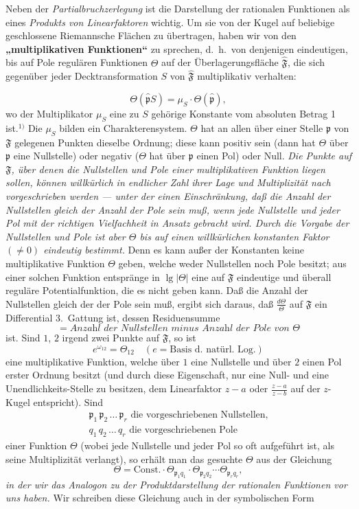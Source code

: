 \documentclass{article}
\begin{document}
Neben der \emph{Partialbruchzerlegung} ist die Darstellung der rationalen Funktionen als eines \emph{Produkts von Linearfaktoren} wichtig. Um sie von der Kugel auf beliebige geschlossene Riemannsche Flächen zu übertragen, haben wir von den \textbf{„multiplikativen Funktionen“} zu sprechen, d.\ h.\ von denjenigen eindeutigen, bis auf Pole regulären Funktionen $\Theta$ auf der Überlagerungsfläche $\hat{\mathfrak{F}}$, die sich gegenüber jeder Decktransformation $S$ von $\hat{\mathfrak{F}}$ multiplikativ verhalten:

\[ \Theta(\hat{\mathfrak{p}}S) = \mu_S \cdot \Theta(\hat{\mathfrak{p}}), \]
wo der Multiplikator $\mu_S$ eine zu $S$ gehörige Konstante vom absoluten Betrag 1 ist.${}^{1)}$ Die $\mu_S$ bilden ein Charakterensystem. $\Theta$ hat an allen über einer Stelle $\mathfrak{p}$ von $\mathfrak{F}$ gelegenen Punkten dieselbe Ordnung; diese kann positiv sein (dann hat $\Theta$ über $\mathfrak{p}$ eine Nullstelle) oder negativ ($\Theta$ hat über $\mathfrak{p}$ einen Pol) oder Null. \emph{Die Punkte auf $\mathfrak{F}$, über denen die Nullstellen und Pole einer multiplikativen Funktion liegen sollen, können willkürlich in endlicher Zahl ihrer Lage und Multiplizität nach vorgeschrieben werden --- unter der einen Einschränkung, daß die Anzahl der Nullstellen gleich der Anzahl der Pole sein muß, wenn jede Nullstelle und jeder Pol mit der richtigen Vielfachheit in Ansatz gebracht wird. Durch die Vorgabe der Nullstellen und Pole ist aber $\Theta$ bis auf einen willkürlichen konstanten Faktor $(\neq 0)$ eindeutig bestimmt.} Denn es kann außer der Konstanten keine multiplikative Funktion $\Theta$ geben, welche weder Nullstellen noch Pole besitzt; aus einer solchen Funktion entspränge in $\lg |\Theta|$ eine auf $\mathfrak{F}$ eindeutige und überall reguläre Potentialfunktion, die es nicht geben kann. Daß die Anzahl der Nullstellen gleich der der Pole sein muß, ergibt sich daraus, daß $\frac{d\Theta}{\Theta}$ auf $\mathfrak{F}$ ein Differential 3.\ Gattung ist, dessen Residuensumme
\[ = \textit{Anzahl der Nullstellen minus Anzahl der Pole von } \Theta \]
ist. Sind $1$, $2$ irgend zwei Punkte auf $\mathfrak{F}$, so ist
\[ e^{\omega_{12}} = \Theta_{12} \quad (e = \text{Basis d.\ natürl.\ Log.}) \]
eine multiplikative Funktion, welche über $1$ eine Nullstelle und über $2$ einen Pol erster Ordnung besitzt (und durch diese Eigenschaft, nur eine Null- und eine Unendlichkeits-Stelle zu besitzen, dem Linearfaktor $z - a$ oder $\frac{z-a}{z-b}$ auf der $z$-Kugel entspricht). Sind
\[ \begin{gathered}
\mathfrak{p}_1 \, \mathfrak{p}_2 \, \dots \, \mathfrak{p}_r \text{ die vorgeschriebenen Nullstellen,} \\
q_1 \, q_2 \, \dots \, q_r \text{ die vorgeschriebenen Pole}
\end{gathered} \]
einer Funktion $\Theta$ (wobei jede Nullstelle und jeder Pol so oft aufgeführt ist, als seine Multiplizität verlangt), so erhält man das gesuchte $\Theta$ aus der Gleichung
\[ \Theta = \text{Const.} \cdot \Theta_{\mathfrak{p}_1 q_1} \cdot \Theta_{\mathfrak{p}_2 q_2} \cdots \Theta_{\mathfrak{p}_r q_r}, \]
\emph{in der wir das Analogon zu der Produktdarstellung der rationalen Funktionen vor uns haben.} Wir schreiben diese Gleichung auch in der symbolischen Form
\end{document}
